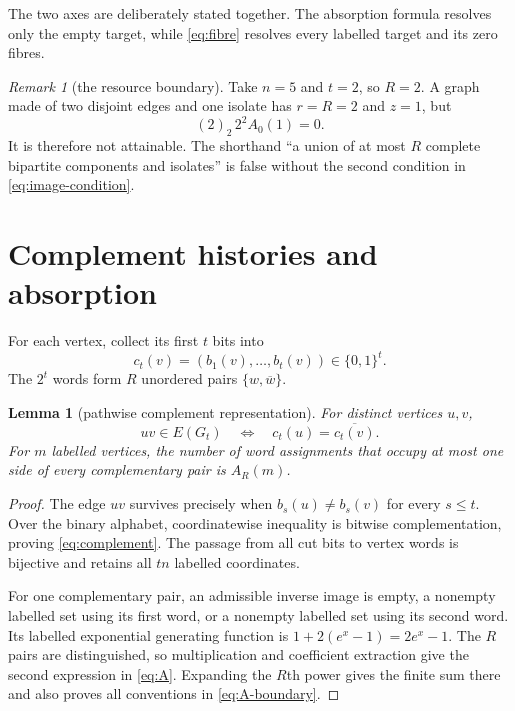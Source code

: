 \documentclass[a4paper,10pt]{amsart}
\newtheorem{lemma}[theorem]{Lemma}
\theoremstyle{remark}
\newtheorem{remark}[theorem]{Remark}
\newcommand{\cbar}[1]{\overline{#1}}
\begin{document}
The two axes are deliberately stated together.  The absorption formula
resolves only the empty target, while \eqref{eq:fibre} resolves every labelled
target and its zero fibres.

\begin{remark}[the resource boundary]\label{rem:boundary}
Take $n=5$ and $t=2$, so $R=2$.  A graph made of two disjoint edges and one
isolate has $r=R=2$ and $z=1$, but
\[
 (2)_2\,2^2A_0(1)=0.
\]
It is therefore not attainable.  The shorthand ``a union of at most $R$
complete bipartite components and isolates'' is false without the second
condition in \eqref{eq:image-condition}.
\end{remark}

\section{Complement histories and absorption}\label{sec:history}

For each vertex, collect its first $t$ bits into
\[
 c_t(v)=(b_1(v),\ldots,b_t(v))\in\{0,1\}^t.
\]
The $2^t$ words form $R$ unordered pairs $\{w,\cbar w\}$.

\begin{lemma}[pathwise complement representation]\label{lem:complement}
For distinct vertices $u,v$,
\begin{equation}\label{eq:complement}
 uv\in E(G_t)\quad\Longleftrightarrow\quad
 c_t(u)=\cbar{c_t(v)}.
\end{equation}
For $m$ labelled vertices, the number of word assignments that occupy at
most one side of every complementary pair is $A_R(m)$.
\end{lemma}

\begin{proof}
The edge $uv$ survives precisely when $b_s(u)\ne b_s(v)$ for every
$s\leq t$.  Over the binary alphabet, coordinatewise inequality is bitwise
complementation, proving \eqref{eq:complement}.  The passage from all cut bits
to vertex words is bijective and retains all $tn$ labelled coordinates.

For one complementary pair, an admissible inverse image is empty, a nonempty
labelled set using its first word, or a nonempty labelled set using its second
word.  Its labelled exponential generating function is
$1+2(e^x-1)=2e^x-1$.  The $R$ pairs are distinguished, so multiplication and
coefficient extraction give the second expression in \eqref{eq:A}.  Expanding
the $R$th power gives the finite sum there and also proves all conventions in
\eqref{eq:A-boundary}.
\end{proof}
\end{document}
